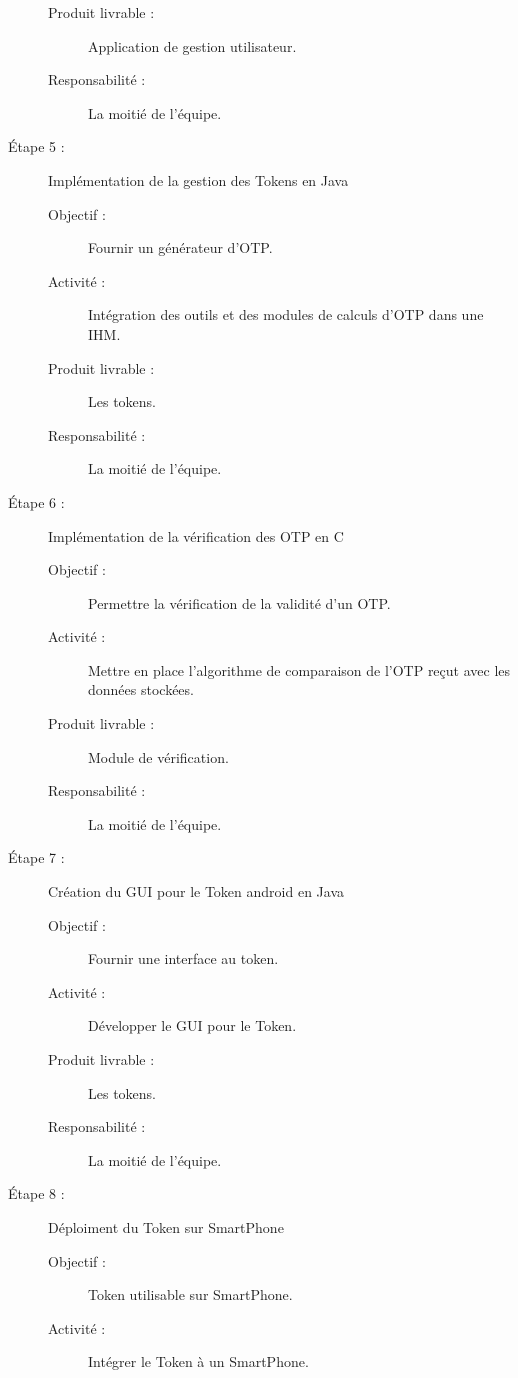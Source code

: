 \documentclass{../../res/univ-projet}
\begin{document}
\begin{description}
\begin{description}
		        \item [Produit livrable :] Application de gestion utilisateur.
		        \item [Responsabilité :] La moitié de l'équipe.
		    \end{description}
	    \item [Étape 5 :] Implémentation de la gestion des Tokens en Java
		    \begin{description}
		        \item [Objectif :] Fournir un générateur d'OTP.
		        \item [Activité :] Intégration des outils et des modules de calculs d'OTP dans une IHM.
		        \item [Produit livrable :] Les tokens.
		        \item [Responsabilité :]  La moitié de l'équipe.
		    \end{description}
	    \item [Étape 6 :] Implémentation de la vérification des OTP en C
		    \begin{description}
		        \item [Objectif :] Permettre la vérification de la validité d'un OTP.
		        \item [Activité :] Mettre en place l'algorithme de comparaison de l'OTP reçut avec les données stockées.
		        \item [Produit livrable :] Module de vérification.
		        \item [Responsabilité :] La moitié de l'équipe.
	            \end{description}
	    \item [Étape 7 :] Création du GUI pour le Token android en Java
		    \begin{description}
		        \item [Objectif :] Fournir une interface au token.
		        \item [Activité :] Développer le GUI pour le Token.
		        \item [Produit livrable :] Les tokens.
		        \item [Responsabilité :]  La moitié de l'équipe.
		    \end{description}
	    \item [Étape 8 :] Déploiment du Token sur SmartPhone
		    \begin{description}
		        \item [Objectif :] Token utilisable sur SmartPhone.
		        \item [Activité :] Intégrer le Token à un SmartPhone.

\end{description}
\end{description}
\end{document}
